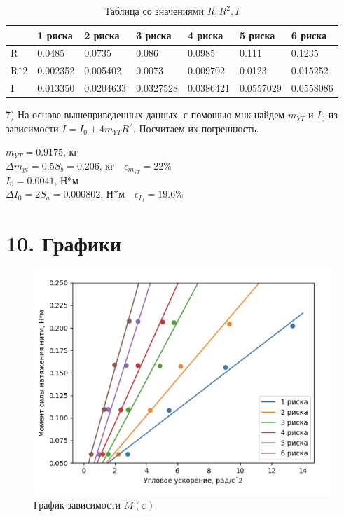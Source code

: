 \documentclass[14pt]{extreport}
\begin{document}
\begin{table}[!ht]
    \centering
    \begin{tabular}{|l|l|l|l|l|l|l|}
    \hline
        ~ & 1 риска & 2 риска & 3 риска & 4 риска & 5 риска & 6 риска  \\ \hline
        R & 0.0485 & 0.0735 & 0.086 & 0.0985 & 0.111 & 0.1235  \\ \hline
        Rˆ2 & 0.002352 & 0.005402 & 0.0073 & 0.009702 & 0.0123 & 0.015252  \\ \hline
        I & 0.013350 & 0.0204633 & 0.0327528 & 0.0386421 & 0.0557029 & 0.0558086 \\ \hline
    \end{tabular}
    \caption{Таблица со значениями $R, R^2, I$}
\end{table}

7) На основе вышеприведенных данных, с помощью мнк найдем $m_{YT}$ и $I_0$ из зависимости $I = I_0 + 4m_{YT}R^2$. Посчитаем их погрешность.
\begin{center}
    $m_{YT} = 0.9175 \text{, кг}$ \\
    $\Delta m_{yt} = 0.5S_b = 0.206 \text{, кг} \quad \epsilon_{m_{YT}} = 22\%$ \\
    $I_0 = 0.0041 \text{, Н*м} $ \\
    $\Delta I_0 = 2S_a = 0.000802 \text{, Н*м} \quad \epsilon_{I_0} = 19.6\%$
\end{center}

\section*{10. Графики}
\begin{figure}[H]
	\begin{center}
		\includegraphics[scale=1]{M_e.png}
		\caption{График зависимости $M(\varepsilon)$}
		\label{pic}
	\end{center}
\end{figure}
\end{document}
